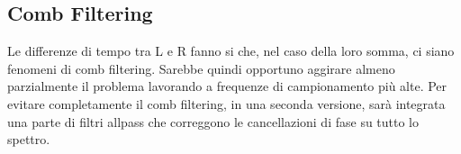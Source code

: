 \documentclass{article}
\begin{document}
\subsection{Comb Filtering}
    Le differenze di tempo tra L e R fanno si che, nel caso della loro somma, ci siano fenomeni di comb filtering. Sarebbe quindi opportuno aggirare almeno parzialmente il problema lavorando a frequenze di campionamento più alte. Per evitare completamente il comb filtering, in una seconda versione, sarà integrata una parte di filtri allpass che correggono le cancellazioni di fase su tutto lo spettro.
\end{document}
